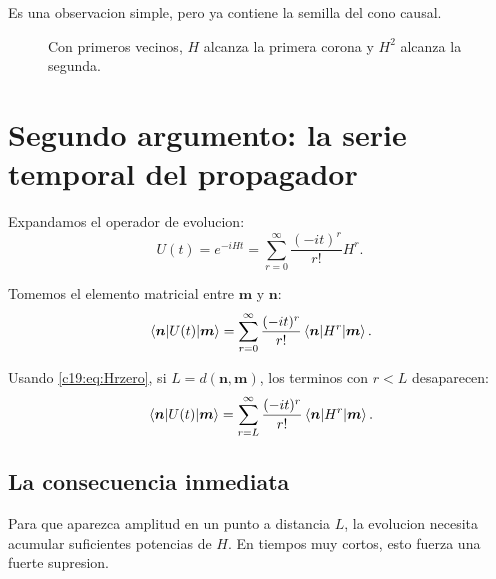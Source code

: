 Es una observacion simple, pero ya contiene la semilla del cono causal.

\begin{figure}[h!]
\centering
{}
\caption{Con primeros vecinos, \(H\) alcanza la primera corona y \(H^2\) alcanza la segunda.}
\end{figure}

\section{Segundo argumento: la serie temporal del propagador}
Expandamos el operador de evolucion:
\begin{equation}
U(t)=e^{-iHt}
= \sum_{r=0}^{\infty}\frac{(-it)^r}{r!}H^r.
\label{c19:eq:Useries}
\end{equation}

Tomemos el elemento matricial entre \(\bm{m}\) y \(\bm{n}\):
\begin{equation}
\mel{\bm{n}}{U(t)}{\bm{m}}
= \sum_{r=0}^{\infty}\frac{(-it)^r}{r!}\mel{\bm{n}}{H^r}{\bm{m}}.
\label{c19:eq:matrixel}
\end{equation}

Usando \eqref{c19:eq:Hrzero}, si \(L=d(\bm{n},\bm{m})\), los terminos con \(r<L\) desaparecen:
\begin{equation}
\mel{\bm{n}}{U(t)}{\bm{m}}
= \sum_{r=L}^{\infty}\frac{(-it)^r}{r!}\mel{\bm{n}}{H^r}{\bm{m}}.
\label{c19:eq:tailseries}
\end{equation}

\subsection{La consecuencia inmediata}
Para que aparezca amplitud en un punto a distancia \(L\), la evolucion necesita acumular suficientes potencias de \(H\). En tiempos muy cortos, esto fuerza una fuerte supresion.

